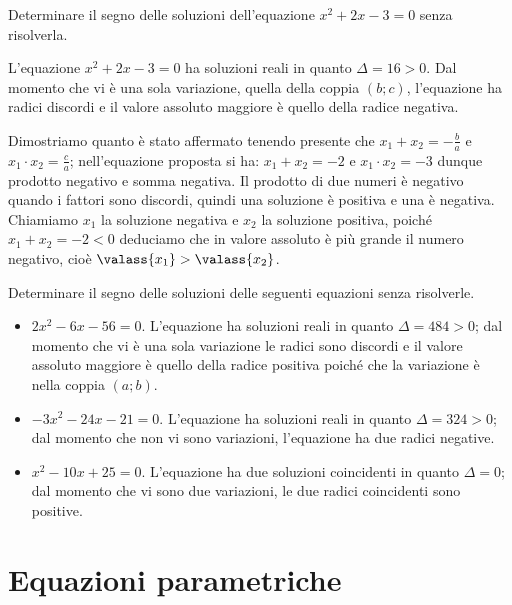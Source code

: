 \begin{exrig}
\begin{esempio}
Determinare il segno delle soluzioni dell'equazione $x^2 + 2 x - 3 = 0$ senza risolverla.

L'equazione $x^2 + 2 x - 3 = 0$ ha soluzioni reali in quanto $\Delta = 16 > 0$. Dal momento che vi è una sola variazione, quella della coppia $(b;c)$, l'equazione ha radici discordi e il valore assoluto maggiore è quello della radice negativa.

Dimostriamo quanto è stato affermato tenendo presente che $x_{1} + x_{2} = - \frac{b}{a}$ e $x_{1}\cdot x_{2} = \frac{c}{a}$; nell'equazione proposta si ha:
$x_{1} + x_{2} = - 2$ e $x_{1} \cdot x_{2} = - 3$ dunque prodotto negativo e somma negativa. Il prodotto di due numeri è negativo quando i fattori sono discordi, quindi una soluzione è positiva e una è negativa. Chiamiamo $x_1$ la soluzione negativa e $x_2$ la soluzione positiva, poiché $x_{1} + x_{2} = - 2 < 0$ deduciamo che in valore assoluto è più grande il numero negativo, cioè $\valass{x_{1}} > \valass{x_{2}}$.
\end{esempio}

\begin{esempio}
Determinare il segno delle soluzioni delle seguenti equazioni senza risolverle.
\begin{itemize}
	\item $2 x^{2} - 6 x - 56 = 0$. L'equazione ha soluzioni reali in quanto $\Delta = 484 > 0$; dal momento che vi è una sola variazione le radici sono discordi
	e il valore assoluto maggiore è quello della radice positiva poiché che la variazione è nella coppia $(a;b)$.
	\item $-3 x^{2} - 24 x - 21 = 0$. L'equazione ha soluzioni reali in quanto $\Delta = 324 > 0$; dal momento che non vi sono variazioni, l'equazione ha due radici negative.
	\item $x^{2} - 10 x + 25 = 0$. L'equazione ha due soluzioni coincidenti in quanto $\Delta = 0$; dal momento che vi sono due variazioni, le due radici coincidenti sono positive.
\end{itemize}
\end{esempio}
\end{exrig}
\vspazio\ovalbox{\risolvii \ref{ese:3.88}, \ref{ese:3.89}, \ref{ese:3.90}}

\section{Equazioni parametriche}

